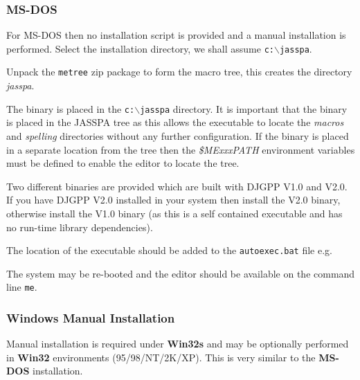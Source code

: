 \documentclass[11pt,a4paper,pdftex]{article}
\begin{document}
\subsubsection{MS-DOS}

  For MS-DOS then no installation script is provided and a manual installation
  is performed. Select the installation directory, we shall assume
  \texttt{c:$\backslash$jasspa}.

  Unpack the \texttt{metree} zip package to form the macro tree, this creates
  the directory \textit{jasspa}.


  The binary is placed in the \texttt{c:$\backslash$jasspa} directory. It is
  important that the binary is placed in the JASSPA tree as this allows the
  executable to locate the \textit{macros} and \textit{spelling} directories
  without any further configuration. If the binary is placed in a separate
  location from the tree then the \textit{\$MExxxPATH} environment variables
  must be defined to enable the editor to locate the tree.

  Two different binaries are provided which are built with DJGPP V1.0 and
  V2.0. If you have DJGPP V2.0 installed in your system then install the V2.0
  binary, otherwise install the V1.0 binary (as this is a self contained
  executable and has no run-time library dependencies).


  The location of the executable should be added to the \texttt{autoexec.bat}
  file e.g.


  The system may be re-booted and the editor should be available on the
  command line \texttt{me}.

\subsubsection{Windows Manual Installation}

  Manual installation is required under \textbf{Win32s} and may be optionally
  performed in \textbf{Win32} environments (95/98/NT/2K/XP). This is very
  similar to the \textbf{MS-DOS} installation.
\end{document}
